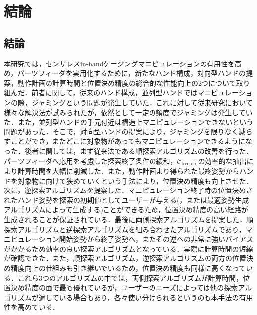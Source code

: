 \documentclass[a4paper,twoside,12pt,papersize, dvipdfmx]{iirthesis}
\begin{document}
    \newcommand{\figref}[1]{\figurename\ref{#1}}
    \newcommand{\tabref}[1]{\tablename\ref{#1}}
    \renewcommand{\eqref}[1]{式~(\ref{#1})}
    \newcommand{\chapref}[1]{\ref{#1}章}
    \newcommand{\secref}[1]{\ref{#1}節}
    \newcommand{\ssecref}[1]{\ref{#1}項}
    \newcommand{\appref}[1]{付録\ref{#1}}
\fi


\chapter{結論}\label{chap::conclusion}
\minitoc
\section{結論}\label{sec::conclusion::conclusion}
本研究では，センサレスin-handケージングマニピュレーションの有用性を高め，パーツフィーダを実用化するために，新たなハンド構成，対向型ハンドの提案，動作計画の計算時間と位置決め精度の総合的な性能向上の2つについて取り組んだ．前者に関して，従来のハンド構成，並列型ハンドではマニピュレーションの際，ジャミングという問題が発生していた．これに対して従来研究において様々な解決法が試みられたが，依然として一定の頻度でジャミングは発生していた．また，並列型ハンドの手元付近は構造上マニピュレーションできないという問題があった．そこで，対向型ハンドの提案により，ジャミングを限りなく減らすことができ，またどこに対象物があってもマニピュレーションできるようになった．後者に関しては，まず従来法である順探索アルゴリズムの改善を行った．パーツフィーダへ応用を考慮した探索終了条件の緩和，$\mathcal{C}_{\mathrm{free\_obj}}$の効率的な抽出により計算時間を大幅に削減した．また，動作計画より得られた最終姿勢からハンドを対象物に向けて狭めていくという手法により，位置決め精度も向上させた．次に，逆探索アルゴリズムを提案した．マニピュレーション終了時の位置決めされたハンド姿勢を探索の初期値としてユーザーが与える(，または最適姿勢生成アルゴリズムによって生成する)ことができるため，位置決め精度の高い経路が生成されることが保証されている．最後に両側探索アルゴリズムを提案した．順探索アルゴリズムと逆探索アルゴリズムを組み合わせたアルゴリズムであり，マニピュレーション開始姿勢から終了姿勢へ，またその逆への非常に強いバイアスがかかるため効率の良い探索アルゴリズムとなっている．実際に計算時間の短縮が確認できた．また，順探索アルゴリズム，逆探索アルゴリズムの両方の位置決め精度向上の仕組みも引き継いでいるため，位置決め精度も同様に高くなっている．これら3つのアルゴリズムの中では，両側探索アルゴリズムが計算時間，位置決め精度の面で最も優れているが，ユーザーのニーズによっては他の探索アルゴリズムが適している場合もあり，各々使い分けられるというのも本手法の有用性を高めている．\par
\end{document}
